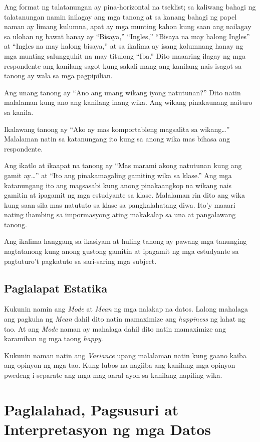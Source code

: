 \documentclass [11pt] {report}
\begin{document}
Ang format ng talatanungan ay pina-horizontal na tseklist; sa kaliwang bahagi ng
talatanungan namin inilagay ang mga tanong at sa kanang bahagi ng papel naman ay
limang kulumna, apat ay mga munting kahon kung saan ang nailagay sa ulohan ng
bawat hanay ay ``Bisaya,'' ``Ingles,'' ``Bisaya na may halong Ingles'' at
``Ingles na may halong bisaya,'' at sa ikalima ay isang kolumnang hanay ng mga
munting salungguhit na may titulong ``Iba.'' Dito maaaring ilagay ng mga
respondente ang kanilang sagot kung sakali mang ang kanilang nais isagot sa
tanong ay wala sa mga pagpipilian.

Ang unang tanong ay ``Ano ang unang wikang iyong natutunan?'' Dito natin
malalaman kung ano ang kanilang inang wika. Ang wikang pinakaunang naituro sa
kanila.
  
Ikalawang tanong ay ``Ako ay mas komportableng magsalita sa wikang\ldots''
Malalaman natin sa katanungang ito kung sa anong wika mas bihasa ang
respondente.

Ang ikatlo at ikaapat na tanong ay ``Mas marami akong natutunan kung ang gamit
ay\ldots'' at ``Ito ang pinakamagaling gamiting wika sa klase.'' Ang mga
katanungang ito ang magsasabi kung anong pinakaangkop na wikang nais gamitin at
ipagamit ng mga estudyante sa klase. Malalaman rin dito ang wika kung saan sila
mas natututo sa klase sa pangkalahatang diwa. Ito’y maaari nating ihambing sa
impormasyong ating makakalap sa una at pangalawang tanong.

Ang ikalima hanggang sa ikasiyam at huling tanong ay pawang mga tanunging
nagtatanong kung anong gustong gamitin at ipagamit ng mga estudyante sa
pagtuturo’t pagkatuto sa sari-saring mga subject.
\section{Paglalapat Estatika}
Kukunin namin ang \emph{Mode} at \emph{Mean} ng mga nalakap na datos. Lalong
mahalaga ang pagkuha ng \emph{Mean} dahil dito natin mamaximize ang
\emph{happiness} ng lahat ng tao. At ang \emph{Mode} naman ay mahalaga dahil
dito natin mamaximize ang karamihan ng mga taong \emph{happy}.

Kukunin naman natin ang \emph{Variance} upang malalaman natin kung gaano kaiba
ang opinyon ng mga tao. Kung lubos na nagiiba ang kanilang mga opinyon pwedeng
i-separate ang mga mag-aaral ayon sa kanilang napiling wika.

\chapter{Paglalahad, Pagsusuri at Interpretasyon ng mga Datos}
\end{document}
